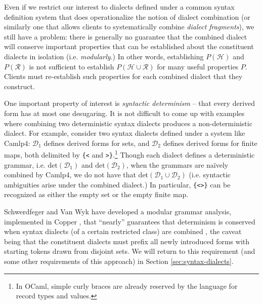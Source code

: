 Even if we restrict our interest  to dialects defined under a common syntax definition system that does operationalize the notion of dialect combination (or similarly one that allows clients to systematically combine \emph{dialect fragments}), we still have a problem: there is generally no guarantee that the combined dialect will conserve important properties that can be established about the constituent dialects in isolation (i.e. \emph{modularly}.) In other words, establishing $P(\mathcal{H})$ and $P(\mathcal{R})$ is not sufficient to establish $P(\mathcal{H} \cup \mathcal{R})$ for many useful properties $P$. Clients must re-establish such properties for each combined dialect that they construct.%

One important property of interest is \emph{syntactic determinism} -- that every derived form has at most one desugaring. It is not difficult to come up with examples where combining two deterministic syntax dialects produces a non-deterministic dialect. For example, consider two syntax dialects defined under a system like Camlp4: $\mathcal{D}_1$ defines derived forms for sets, and $\mathcal{D}_2$ defines derived forms for finite maps, both delimited by \verb~{<~ and \verb~>}~.\footnote{In OCaml, simple curly braces are already reserved by the language for record types and values.} Though each dialect defines a deterministic grammar, i.e. $\mathrm{det}(\mathcal{D}_1)$ and $\mathrm{det}(\mathcal{D}_2)$, when the grammars are na\"ively combined by Camlp4, we do not have that $\mathrm{det}(\mathcal{D}_1 \cup \mathcal{D}_2)$ (i.e. syntactic ambiguities arise under the combined dialect.) In particular, \verb~{<>}~ can be recognized as either the empty set or the empty finite map. %

Schwerdfeger and Van Wyk have developed a modular grammar analysis, implemented in Copper \cite{conf/gpce/WykS07}, that ``nearly'' guarantees that determinism is conserved when syntax dialects (of a certain restricted class) are combined \cite{conf/pldi/SchwerdfegerW09}, the caveat being that the constituent dialects must prefix all newly introduced forms with starting tokens drawn from disjoint sets. We will return to this requirement (and some other requirements of this approach) in Section \ref{sec:syntax-dialects}.



